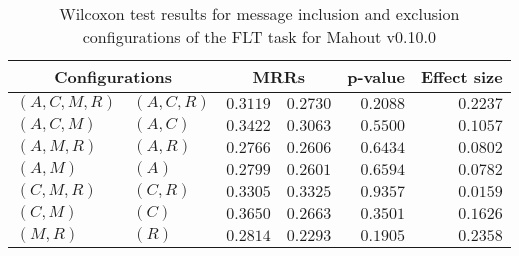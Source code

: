 
\begin{table}
\begin{spacing}{1.2}
\centering
\caption{Wilcoxon test results for message inclusion and exclusion configurations of the FLT task for Mahout v0.10.0}
\label{table:versus-wilcox-mahout-flt-message}
\begin{tabular}{ll|rr|rr}
\toprule
      \multicolumn{2}{c|}{Configurations} &          \multicolumn{2}{c|}{MRRs} &       p-value & Effect size \\
\midrule
 $(A,C,M,R)$ &  $(A,C,R)$ & $0.3119$ & $0.2730$ & $0.2088$ &    $0.2237$ \\
   $(A,C,M)$ &    $(A,C)$ & $0.3422$ & $0.3063$ & $0.5500$ &    $0.1057$ \\
   $(A,M,R)$ &    $(A,R)$ & $0.2766$ & $0.2606$ & $0.6434$ &    $0.0802$ \\
     $(A,M)$ &      $(A)$ & $0.2799$ & $0.2601$ & $0.6594$ &    $0.0782$ \\
   $(C,M,R)$ &    $(C,R)$ & $0.3305$ & $0.3325$ & $0.9357$ &    $0.0159$ \\
     $(C,M)$ &      $(C)$ & $0.3650$ & $0.2663$ & $0.3501$ &    $0.1626$ \\
     $(M,R)$ &      $(R)$ & $0.2814$ & $0.2293$ & $0.1905$ &    $0.2358$ \\
\bottomrule
\end{tabular}

\end{spacing}
\end{table}

